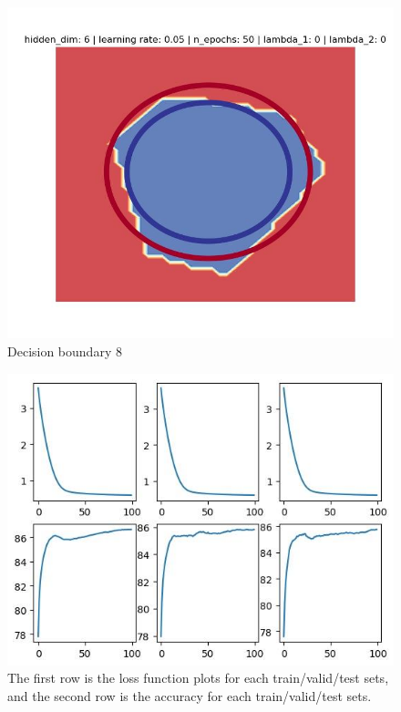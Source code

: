 \documentclass[11pt,english]{article}
\begin{document}
\begin{figure}
	\includegraphics[width=\linewidth]{decision8.jpg}
	\caption{Decision boundary 8}
	\label{fig:boat1}
\end{figure}

\begin{figure}
	\includegraphics[width=\linewidth]{pic5.jpg}
	\caption{The first row is the loss function plots for each train/valid/test sets, and the second row is the accuracy for each train/valid/test sets.}
	\label{fig:boat1}
\end{figure}
\end{document}
